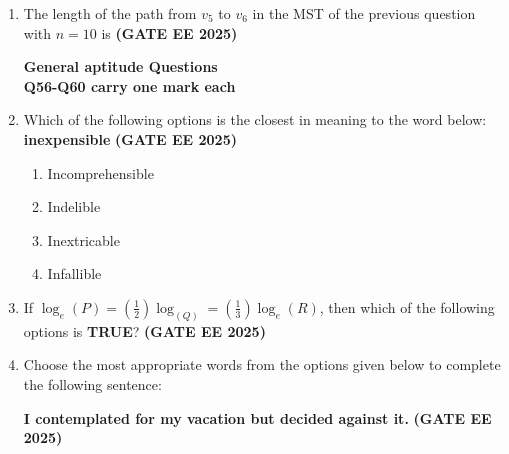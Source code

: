 \documentclass[journal,12pt,onecolumn]{IEEEtran}
\theoremstyle{remark}
\begin{document}
\begin{enumerate}
\begin{enumerate}
\end{enumerate}
\item The length of the path from $v_5$ to $v_6$ in the MST of the previous question with $n=10$ is \hfill \textbf{(GATE EE 2025)}
\begin{enumerate}
\end{enumerate}
\textbf{General aptitude  Questions}
\\
\textbf{Q56-Q60 carry one mark each}
\item  Which of the following options is the closest in meaning to the word below: \\\textbf{inexpensible} \hfill \textbf{(GATE EE 2025)}

\begin{enumerate}
    \item Incomprehensible
    \item Indelible
    \item Inextricable
    \item Infallible
\end{enumerate}
\item  If $\log_e (P) =(\frac{1}{2}) \log_(Q)=(\frac{1}{3}) \log_e (R)$, then which of the following options is \textbf{TRUE}? \hfill \textbf{(GATE EE 2025)}
\begin{enumerate}
\end{enumerate}
\item  Choose the most appropriate words from the options given below to complete the following sentence:

\textbf{I contemplated \underline{\makebox[2cm]{\hfill}} for my vacation but decided against it.} \hfill \textbf{(GATE EE 2025)}


\end{enumerate}
\end{document}
